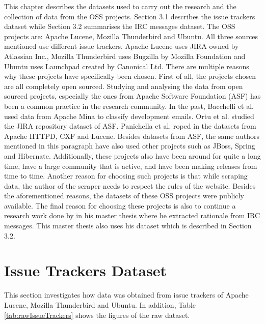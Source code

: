 \documentclass[a4paper,12pt,twoside]{report}
\begin{document}
This chapter describes the datasets used to carry out the research and the collection of data from the \acs{OSS} projects. Section 3.1 describes the issue trackers dataset while Section 3.2 summarises the \acs{IRC} messages dataset. The \acs{OSS} projects are: Apache Lucene, Mozilla Thunderbird and Ubuntu. All three sources mentioned use different issue trackers. Apache Lucene uses JIRA owned by Atlassian Inc., Mozilla Thunderbird uses Bugzilla by Mozilla Foundation and Ubuntu uses Launchpad created by Canonical Ltd. 
\newline \newline
There are multiple reasons why these projects have specifically been chosen. First of all, the projects chosen are all completely open sourced. Studying and analysing the data from open sourced projects, especially the ones from Apache Software Foundation (ASF) has been a common practice in the research community. In the past, Bacchelli et al.\cite{Bacchelli2012} used data from Apache Mina to classify development emails. Ortu et al.\cite{Ortu2015} studied the JIRA repository dataset of ASF. Panichella et al. \cite{Panichella2014} roped in the datasets from Apache HTTPD, CXF and Lucene. Besides datasets from ASF, the same authors mentioned in this paragraph have also used other projects such as JBoss, Spring and Hibernate. Additionally, these projects also have been around for quite a long time, have a large community that is active, and have been making releases from time to time. Another reason for choosing such projects is that while scraping data, the author of the scraper needs to respect the rules of the website. Besides the aforementioned reasons, the datasets of these \acs{OSS} projects were publicly available. The final reason for choosing these projects is also to continue a research work done by \cite{Nonnenmacher2017} in his master thesis where he extracted rationale from \acs{IRC} messages. This master thesis also uses his dataset which is described in Section 3.2. 

\section{Issue Trackers Dataset}
This section investigates how data was obtained from issue trackers of Apache Lucene, Mozilla Thunderbird and Ubuntu. In addition, Table \ref{tab:rawIssueTrackers} shows the figures of the raw dataset. 
\end{document}
